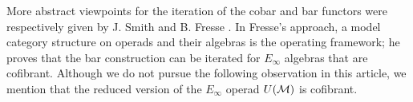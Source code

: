 
More abstract viewpoints for the iteration of the cobar and bar functors were respectively given by J. Smith \cite{smith1994cobar} and B. Fresse \cite{fresse2010props}.
In Fresse's approach, a model category structure on operads and their algebras is the operating framework; he proves that the bar construction can be iterated for $E_\infty$ algebras that are cofibrant.
Although we do not pursue the following observation in this article, we mention that the reduced version of the $E_\infty$ operad $U(\mathcal{M})$ is cofibrant.






